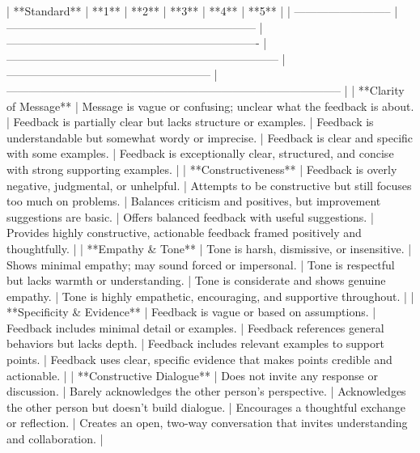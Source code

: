 | **Standard**               | **1**                                                              | **2**                                                               | **3**                                                                    | **4**                                                  | **5**                                                                                     |
| -------------------------- | ------------------------------------------------------------------ | ------------------------------------------------------------------- | ------------------------------------------------------------------------ | ------------------------------------------------------ | ----------------------------------------------------------------------------------------- |
| **Clarity of Message**     | Message is vague or confusing; unclear what the feedback is about. | Feedback is partially clear but lacks structure or examples.        | Feedback is understandable but somewhat wordy or imprecise.              | Feedback is clear and specific with some examples.     | Feedback is exceptionally clear, structured, and concise with strong supporting examples. |
| **Constructiveness**       | Feedback is overly negative, judgmental, or unhelpful.             | Attempts to be constructive but still focuses too much on problems. | Balances criticism and positives, but improvement suggestions are basic. | Offers balanced feedback with useful suggestions.      | Provides highly constructive, actionable feedback framed positively and thoughtfully.     |
| **Empathy & Tone**         | Tone is harsh, dismissive, or insensitive.                         | Shows minimal empathy; may sound forced or impersonal.              | Tone is respectful but lacks warmth or understanding.                    | Tone is considerate and shows genuine empathy.         | Tone is highly empathetic, encouraging, and supportive throughout.                        |
| **Specificity & Evidence** | Feedback is vague or based on assumptions.                         | Feedback includes minimal detail or examples.                       | Feedback references general behaviors but lacks depth.                   | Feedback includes relevant examples to support points. | Feedback uses clear, specific evidence that makes points credible and actionable.         |
| **Constructive Dialogue**  | Does not invite any response or discussion.                        | Barely acknowledges the other person’s perspective.                 | Acknowledges the other person but doesn’t build dialogue.                | Encourages a thoughtful exchange or reflection.        | Creates an open, two-way conversation that invites understanding and collaboration.       |
